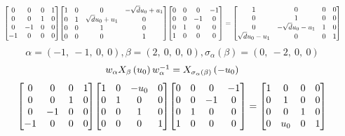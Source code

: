 \documentclass[11pt]{article}
\theoremstyle{definition}
\begin{document}
\[
\scaletoalign{\textwidth}{{\left[\begin{matrix}0 & 0 & 0 & 1\\0 & 0 & 1 & 0\\0 & -1 & 0 & 0\\-1 & 0 & 0 & 0\end{matrix}\right]} {\left[\begin{matrix}1 & 0 & 0 & - \sqrt{d} u_{0} + u_{1}\\0 & 1 & \sqrt{d} u_{0} + u_{1} & 0\\0 & 0 & 1 & 0\\0 & 0 & 0 & 1\end{matrix}\right]} {\left[\begin{matrix}0 & 0 & 0 & -1\\0 & 0 & -1 & 0\\0 & 1 & 0 & 0\\1 & 0 & 0 & 0\end{matrix}\right]} = {\left[\begin{matrix}1 & 0 & 0 & 0\\0 & 1 & 0 & 0\\0 & - \sqrt{d} u_{0} - u_{1} & 1 & 0\\\sqrt{d} u_{0} - u_{1} & 0 & 0 & 1\end{matrix}\right]}}
\]
\[
\alpha = \left( -1, \  -1, \  0, \  0\right), \beta = \left( 2, \  0, \  0, \  0\right), \sigma_{\alpha}(\beta) = \left( 0, \  -2, \  0, \  0\right)
\]
\[
\scaletoalign{\textwidth}{w_{\alpha} X_{\beta}\left(u_{0}\right) w_{\alpha}^{-1} = X_{\sigma_{\alpha}\left(\beta\right)}\left(- u_{0}\right)}
\]
\[
\scaletoalign{\textwidth}{{\left[\begin{matrix}0 & 0 & 0 & 1\\0 & 0 & 1 & 0\\0 & -1 & 0 & 0\\-1 & 0 & 0 & 0\end{matrix}\right]} {\left[\begin{matrix}1 & 0 & - u_{0} & 0\\0 & 1 & 0 & 0\\0 & 0 & 1 & 0\\0 & 0 & 0 & 1\end{matrix}\right]} {\left[\begin{matrix}0 & 0 & 0 & -1\\0 & 0 & -1 & 0\\0 & 1 & 0 & 0\\1 & 0 & 0 & 0\end{matrix}\right]} = {\left[\begin{matrix}1 & 0 & 0 & 0\\0 & 1 & 0 & 0\\0 & 0 & 1 & 0\\0 & u_{0} & 0 & 1\end{matrix}\right]}}
\]
\end{document}
